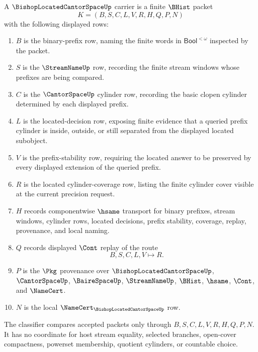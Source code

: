 \begin{definition}
\label{def:bishop-located-cantor-space-carrier}
A $\BishopLocatedCantorSpaceUp$ carrier is a finite $\BHist$ packet
$$
K=(B,S,C,L,V,R,H,Q,P,N)
$$
with the following displayed rows:
\begin{enumerate}
\item $B$ is the binary-prefix row, naming the finite words in $\mathsf{Bool}^{<\omega}$ inspected by the packet.
\item $S$ is the $\StreamNameUp$ row, recording the finite stream windows whose prefixes are being compared.
\item $C$ is the $\CantorSpaceUp$ cylinder row, recording the basic clopen cylinder determined by each displayed prefix.
\item $L$ is the located-decision row, exposing finite evidence that a queried prefix cylinder is inside, outside, or still separated from the displayed located subobject.
\item $V$ is the prefix-stability row, requiring the located answer to be preserved by every displayed extension of the queried prefix.
\item $R$ is the located cylinder-coverage row, listing the finite cylinder cover visible at the current precision request.
\item $H$ records componentwise $\hsame$ transport for binary prefixes, stream windows, cylinder rows, located decisions, prefix stability, coverage, replay, provenance, and local naming.
\item $Q$ records displayed $\Cont$ replay of the route
$$
B,S,C,L,V \longmapsto R .
$$
\item $P$ is the $\Pkg$ provenance over $\BishopLocatedCantorSpaceUp$, $\CantorSpaceUp$, $\BaireSpaceUp$, $\StreamNameUp$, $\BHist$, $\hsame$, $\Cont$, and $\NameCert$.
\item $N$ is the local $\NameCert_{\BishopLocatedCantorSpaceUp}$ row.
\end{enumerate}
The classifier compares accepted packets only through $B,S,C,L,V,R,H,Q,P,N$. It has no coordinate for host stream equality, selected branches, open-cover compactness, powerset membership, quotient cylinders, or countable choice.
\end{definition}


